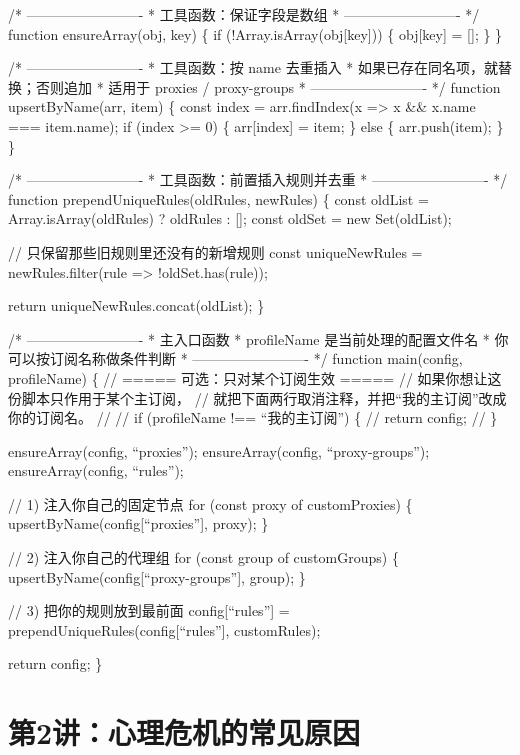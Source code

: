 \documentclass[
  chinese,
  9pt,
  a4paper,
]{ctexart}
\begin{document}
/* ------------------------- * 工具函数：保证字段是数组 *
------------------------- */ function ensureArray(obj, key) \{ if
(!Array.isArray(obj{[}key{]})) \{ obj{[}key{]} = {[}{]}; \} \}

/* ------------------------- * 工具函数：按 name 去重插入 *
如果已存在同名项，就替换；否则追加 * 适用于 proxies / proxy-groups *
------------------------- */ function upsertByName(arr, item) \{ const
index = arr.findIndex(x =\textgreater{} x \&\& x.name === item.name); if
(index \textgreater= 0) \{ arr{[}index{]} = item; \} else \{
arr.push(item); \} \}

/* ------------------------- * 工具函数：前置插入规则并去重 *
------------------------- */ function prependUniqueRules(oldRules,
newRules) \{ const oldList = Array.isArray(oldRules) ? oldRules :
{[}{]}; const oldSet = new Set(oldList);

// 只保留那些旧规则里还没有的新增规则 const uniqueNewRules =
newRules.filter(rule =\textgreater{} !oldSet.has(rule));

return uniqueNewRules.concat(oldList); \}

/* ------------------------- * 主入口函数 * profileName
是当前处理的配置文件名 * 你可以按订阅名称做条件判断 *
------------------------- */ function main(config, profileName) \{ //
===== 可选：只对某个订阅生效 ===== //
如果你想让这份脚本只作用于某个主订阅， //
就把下面两行取消注释，并把``我的主订阅''改成你的订阅名。 // // if
(profileName !== ``我的主订阅'') \{ // return config; // \}

ensureArray(config, ``proxies''); ensureArray(config, ``proxy-groups'');
ensureArray(config, ``rules'');

// 1) 注入你自己的固定节点 for (const proxy of customProxies) \{
upsertByName(config{[}``proxies''{]}, proxy); \}

// 2) 注入你自己的代理组 for (const group of customGroups) \{
upsertByName(config{[}``proxy-groups''{]}, group); \}

// 3) 把你的规则放到最前面 config{[}``rules''{]} =
prependUniqueRules(config{[}``rules''{]}, customRules);

return config; \}

\clearpage

\section{第2讲：心理危机的常见原因}\label{ux7b2c2ux8bb2ux5fc3ux7406ux5371ux673aux7684ux5e38ux89c1ux539fux56e0}
\end{document}
